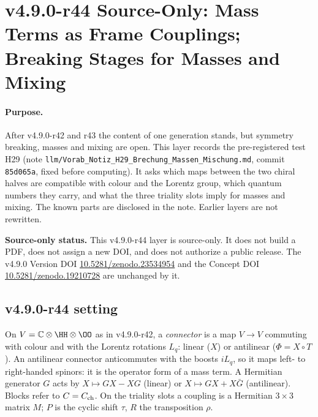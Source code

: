 \clearpage
\section*{v4.9.0-r44 Source-Only: Mass Terms as Frame Couplings; Breaking Stages for Masses and Mixing}
\label{sec:v490-r44-mass-frame-couplings}

\paragraph{Purpose.}
After v4.9.0-r42 and r43 the content of one generation stands, but symmetry breaking, masses and mixing are open.  This layer records the
pre-registered test H29 (note \texttt{llm/Vorab\_Notiz\_H29\_Brechung\_Massen\_Mischung.md}, commit \texttt{85d065a}, fixed before
computing).  It asks which maps between the two chiral halves are compatible with colour and the Lorentz group, which quantum numbers they
carry, and what the three triality slots imply for masses and mixing.  The known parts are disclosed in the note.  Earlier layers are not
rewritten.

\noindent\textbf{Source-only status.}
This v4.9.0-r44 layer is source-only.  It does not build a PDF, does not assign a new DOI,
and does not authorize a public release.  The v4.9.0 Version DOI
\href{https://doi.org/10.5281/zenodo.23534954}{10.5281/zenodo.23534954} and the Concept DOI
\href{https://doi.org/10.5281/zenodo.19210728}{10.5281/zenodo.19210728} are unchanged by it.

\subsection*{v4.9.0-r44 setting}
\label{subsec:v490-r44-setting}

On \(V=\mathbb C\otimes\HH\otimes\OO\) as in v4.9.0-r42, a \emph{connector} is a map \(V\to V\) commuting with colour and with the Lorentz
rotations \(L_q\): linear (\(X\)) or antilinear (\(\Phi=X\circ T\)).  An antilinear connector anticommutes with the boosts \(iL_q\), so it maps
left- to right-handed spinors: it is the operator form of a mass term.  A Hermitian generator \(G\) acts by \(X\mapsto GX-XG\) (linear) or
\(X\mapsto GX+X\bar G\) (antilinear).  Blocks refer to \(C=C_{\rm ch}\).  On the triality slots a coupling is a Hermitian \(3\times3\) matrix
\(M\); \(P\) is the cyclic shift \(\tau\), \(R\) the transposition \(\rho\).

